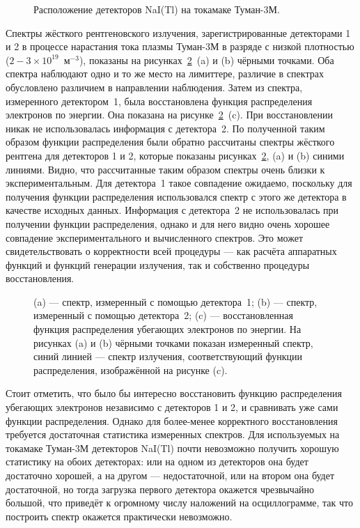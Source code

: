 \begin{figure}[ht!]
  \caption{ Расположение детекторов NaI(Tl) на токамаке Туман-3М.~\cite{Shevelev2013} }
  \label{fig:tumanHxdDetectors}
\end{figure}

Спектры жёсткого рентгеновского излучения, зарегистрированные детекторами 1 и 2 в процессе нарастания тока плазмы Туман-3М в разряде с низкой плотностью ($2-3 \times 10^{19}$~м${}^{-3}$), показаны на рисунках~\ref{fig:tumanHxdSpectrumsEdf}~(a) и (b) чёрными точками. Оба спектра наблюдают одно и то же место на лимиттере, различие в спектрах обусловлено различием в направлении наблюдения. Затем из спектра, измеренного детектором~1, была восстановлена функция распределения электронов по энергии. Она показана на рисунке~\ref{fig:tumanHxdSpectrumsEdf}~(c). При восстановлении никак не использовалась информация с детектора~2. По полученной таким образом функции распределения были обратно рассчитаны спектры жёсткого рентгена для детекторов 1 и 2, которые показаны рисунках~\ref{fig:tumanHxdSpectrumsEdf}, (a) и (b) синими линиями. Видно, что рассчитанные таким образом спектры очень близки к экспериментальным. Для детектора~1 такое совпадение ожидаемо, поскольку для получения функции распределения использовался спектр с этого же детектора в качестве исходных данных. Информация с детектора~2 не использовалась при получении функции распределения, однако и для него видно очень хорошее совпадение экспериментального и вычисленного спектров. Это может свидетельствовать о корректности всей процедуры --- как расчёта аппаратных функций и функций генерации излучения, так и собственно процедуры восстановления.~\cite{Shevelev2013}

\begin{figure}[ht!]
  \caption{ (a) --- спектр, измеренный с помощью детектора~1; (b) --- спектр, измеренный с помощью детектора~2; (c) --- восстановленная функция распределения убегающих электронов по энергии. На рисунках (a) и (b) чёрными точками показан измеренный спектр, синий линией --- спектр излучения, соответствующий функции распределения, изображённой на рисунке (c).~\cite{Shevelev2013} }
  \label{fig:tumanHxdSpectrumsEdf}
\end{figure}

Стоит отметить, что было бы интересно восстановить функцию распределения убегающих электронов независимо с детекторов 1 и 2, и сравнивать уже сами функции распределения. Однако для более-менее корректного восстановления требуется достаточная статистика измеренных спектров. Для используемых на токамаке Туман-3М детекторов NaI(Tl) почти невозможно получить хорошую статистику на обоих детекторах: или на одном из детекторов она будет достаточно хорошей, а на другом --- недостаточной, или на втором она будет достаточной, но тогда загрузка первого детектора окажется чрезвычайно большой, что приведёт к огромному числу наложений на осциллограмме, так что построить спектр окажется практически невозможно. 

